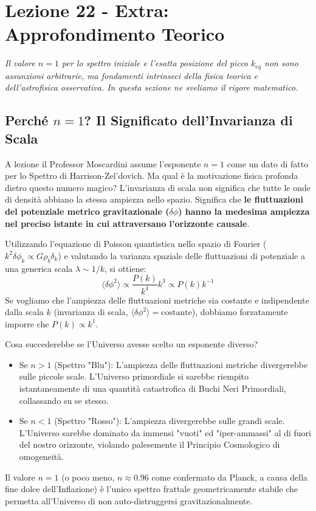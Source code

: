 \documentclass[11pt,a4paper]{report}
\begin{document}
\newpage
\section{Lezione 22 - Extra: Approfondimento Teorico}

\textit{Il valore $n=1$ per lo spettro iniziale e l'esatta posizione del picco $k_{eq}$ non sono assunzioni arbitrarie, ma fondamenti intrinseci della fisica teorica e dell'astrofisica osservativa. In questa sezione ne sveliamo il rigore matematico.}

\subsection{Perché $n=1$? Il Significato dell'Invarianza di Scala}
A lezione il Professor Moscardini assume l'esponente $n=1$ come un dato di fatto per lo Spettro di Harrison-Zel'dovich. Ma qual è la motivazione fisica profonda dietro questo numero magico?
L'invarianza di scala non significa che tutte le onde di densità abbiano la stessa ampiezza nello spazio. Significa che \textbf{le fluttuazioni del potenziale metrico gravitazionale ($\delta\phi$) hanno la medesima ampiezza nel preciso istante in cui attraversano l'orizzonte causale}.

Utilizzando l'equazione di Poisson quantistica nello spazio di Fourier ($k^2 \delta\phi_k \propto G \rho_b \delta_k$) e valutando la varianza spaziale delle fluttuazioni di potenziale a una generica scala $\lambda \sim 1/k$, si ottiene:
\begin{equation}
\langle \delta\phi^2 \rangle \propto \frac{P(k)}{k^4} k^3 \propto P(k) k^{-1}
\end{equation}
Se vogliamo che l'ampiezza delle fluttuazioni metriche sia costante e indipendente dalla scala $k$ (invarianza di scala, $\langle \delta\phi^2 \rangle = \text{costante}$), dobbiamo forzatamente imporre che $P(k) \propto k^1$.

Cosa succederebbe se l'Universo avesse scelto un esponente diverso?
\begin{itemize}
    \item Se $n > 1$ (Spettro "Blu"): L'ampiezza delle fluttuazioni metriche divergerebbe sulle piccole scale. L'Universo primordiale si sarebbe riempito istantaneamente di una quantità catastrofica di Buchi Neri Primordiali, collassando su se stesso.
    \item Se $n < 1$ (Spettro "Rosso"): L'ampiezza divergerebbe sulle grandi scale. L'Universo sarebbe dominato da immensi "vuoti" ed "iper-ammassi" al di fuori del nostro orizzonte, violando palesemente il Principio Cosmologico di omogeneità.
\end{itemize}
Il valore $n=1$ (o poco meno, $n \approx 0.96$ come confermato da Planck, a causa della fine dolce dell'Inflazione) è l'unico spettro frattale geometricamente stabile che permetta all'Universo di non auto-distruggersi gravitazionalmente.
\end{document}
